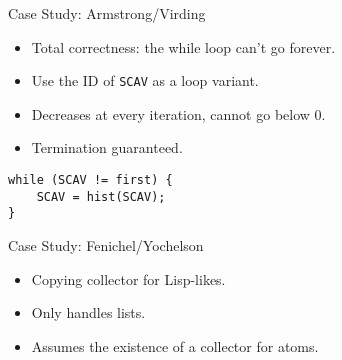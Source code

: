 \documentclass[usenames,dvipsnames]{beamer}
\begin{document}
\begin{frame}[fragile]{Case Study: Armstrong/Virding}
  \begin{itemize}
  \item Total correctness: the while loop can't go forever.
  \item Use the ID of \texttt{SCAV} as a loop variant.
  \item Decreases at every iteration, cannot go below 0.
  \item Termination guaranteed.
  \end{itemize}

  \begin{lstlisting}
while (SCAV != first) {
    SCAV = hist(SCAV);
}
  \end{lstlisting}

\end{frame}

\begin{frame}[fragile]{Case Study: Fenichel/Yochelson}
  \begin{itemize}
  \item Copying collector for Lisp-likes.
  \item Only handles lists.
  \item Assumes the existence of a collector for atoms.
  \end{itemize}

\end{frame}
\end{document}
